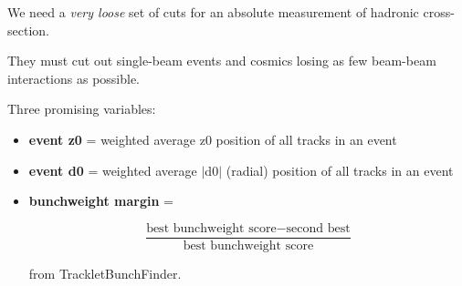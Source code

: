 
\begin{slide*}

\slideframe{}
\huge
{}

\begin{minipage}[t]{\linewidth}
\LARGE

We need a {\it very loose} set of cuts for an absolute measurement of
hadronic cross-section.

\vspace{0.5 cm}

They must cut out single-beam events and cosmics losing as few
beam-beam interactions as possible.

\vspace{0.5 cm}

Three promising variables:
\begin{itemize}

  \item {\bf event z0} = weighted average z0 position of all tracks in
  an event

  \item {\bf event d0} = weighted average $\big|$d0$\big|$ (radial)
  position of all tracks in an event

  \item {\bf bunchweight margin} =

\[ \frac{\mbox{best bunchweight score} - \mbox{second best}}{\mbox{best bunchweight score}} \]

  \begin{flushright} from TrackletBunchFinder. \end{flushright}

\end{itemize}

\end{minipage}

\end{slide*}


